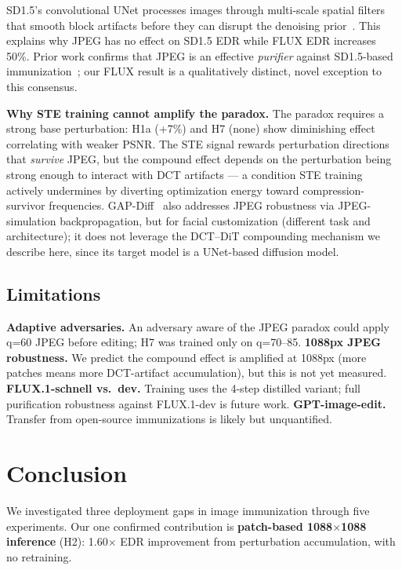 \documentclass{article}
\begin{document}
SD1.5's convolutional UNet processes images through multi-scale spatial filters
that smooth block artifacts before they can disrupt the denoising prior~\citep{pierson2024pixel}.
This explains why JPEG has no effect on SD1.5 EDR while FLUX EDR increases 50\%.
Prior work confirms that JPEG is an effective \emph{purifier} against SD1.5-based
immunization~\citep{zhao2023jpegbypass,vanle2025cannot}; our FLUX result is a qualitatively
distinct, novel exception to this consensus.

\textbf{Why STE training cannot amplify the paradox.} The paradox requires a strong
base perturbation: H1a (+7\%) and H7 (none) show diminishing effect correlating with
weaker PSNR. The STE signal rewards perturbation directions that \emph{survive} JPEG,
but the compound effect depends on the perturbation being strong enough to interact with
DCT artifacts --- a condition STE training actively undermines by diverting optimization
energy toward compression-survivor frequencies. GAP-Diff~\citep{gapdiff2025} also
addresses JPEG robustness via JPEG-simulation backpropagation, but for facial customization
(different task and architecture); it does not leverage the DCT--DiT compounding
mechanism we describe here, since its target model is a UNet-based diffusion model.

\subsection{Limitations}
\label{sec:limitations}

\textbf{Adaptive adversaries.} An adversary aware of the JPEG paradox could apply
q=60 JPEG before editing; H7 was trained only on q=70--85.
\textbf{1088px JPEG robustness.} We predict the compound effect is amplified at 1088px
(more patches means more DCT-artifact accumulation), but this is not yet measured.
\textbf{FLUX.1-schnell vs.\ dev.} Training uses the 4-step distilled variant;
full purification robustness against FLUX.1-dev is future work.
\textbf{GPT-image-edit.} Transfer from open-source immunizations is likely but unquantified.

\section{Conclusion}

We investigated three deployment gaps in image immunization through five experiments.
Our one confirmed contribution is \textbf{patch-based 1088$\times$1088 inference} (H2):
1.60$\times$ EDR improvement from perturbation accumulation, with no retraining.
\end{document}
